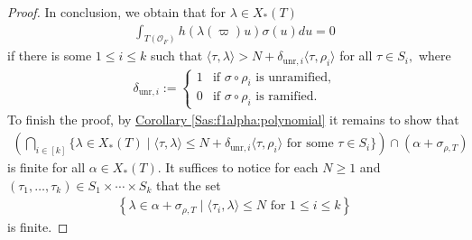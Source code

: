 \documentclass[10pt]{amsart}
\theoremstyle{definition}
\newtheorem{remark}[theorem]{Remark}
\numberwithin{equation}{section}
\numberwithin{equation}{subsection}
\begin{document}
\begin{proof}
In conclusion, we obtain that for $\lambda\in X_\ast(T)$
\begin{align*}
    \int_{T(\mathcal{O}_F)} h(\lambda(\varpi)u) \sigma(u)du = 0 
\end{align*}
if there is some $1\le i\le k$ such that $\langle \tau,\lambda\rangle>N+\delta_{\mathrm{unr},i}\langle \tau,\rho_i\rangle$ for all $\tau\in S_i,$ where 
\begin{align*}
    \delta_{\mathrm{unr},i}:=\begin{cases}
        1 & \textrm{if } \sigma\circ \rho_i \textrm{ is unramified,}\\
        0 & \textrm{if } \sigma\circ \rho_i \textrm{ is ramified.}
    \end{cases}
\end{align*}
To finish the proof, by \hyperref[Sas:f1alpha:polynomial]{Corollary \ref{Sas:f1alpha:polynomial}} it remains to show that
\begin{align*}
    \left(\bigcap_{i\in[k]} \{\lambda\in X_*(T)\mid \langle \tau,\lambda\rangle \le  N+\delta_{\mathrm{unr},i}\langle \tau,\rho_i\rangle \text{ for some }\tau\in S_i\}\right) \cap (\alpha + \sigma_{\rho,T})
\end{align*}
is finite for all $\alpha\in X_*(T)$. It suffices to notice for each $N\geq 1$ and $(\tau_1,\ldots,\tau_k)\in S_1\times\cdots\times S_k$ that the set 
\begin{align*}
    \left\{\lambda\in \alpha+\sigma_{\rho,T}\mid \langle\tau_i,\lambda\rangle \leq N\text{ for }1\leq i\leq k \right\}
\end{align*}
is finite. %
\end{proof}

\end{document}
